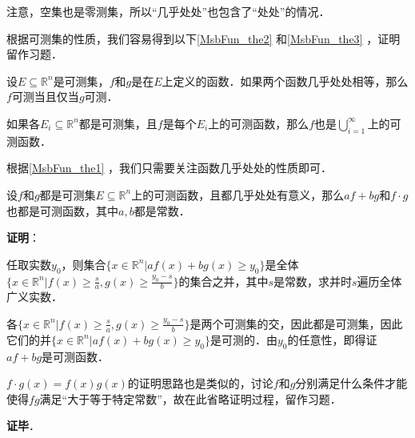 注意，空集也是零测集，所以“几乎处处”也包含了“处处”的情况．

根据可测集的性质，我们容易得到以下\autoref{MsbFun_the2} 和\autoref{MsbFun_the3} ，证明留作习题．

\begin{theorem}{}\label{MsbFun_the2}
设$E\subseteq\mathbb{R}^n$是可测集，$f$和$g$是在$E$上定义的函数．如果两个函数几乎处处相等，那么$f$可测当且仅当$g$可测．
\end{theorem}



\begin{theorem}{}\label{MsbFun_the3}
如果各$E_i\subseteq\mathbb{R}^n$都是可测集，且$f$是每个$E_i$上的可测函数，那么$f$也是$\bigcup_{i=1}^\infty$上的可测函数．
\end{theorem}

根据\autoref{MsbFun_the1} ，我们只需要关注函数几乎处处的性质即可．

\begin{theorem}{}
设$f$和$g$都是可测集$E\subseteq\mathbb{R}^n$上的可测函数，且都几乎处处有意义，那么$af+bg$和$f\cdot g$也都是可测函数，其中$a, b$都是常数．
\end{theorem}

\textbf{证明}：

任取实数$y_0$，则集合$\{x\in\mathbb{R}^n|af(x)+bg(x)\geq y_0\}$是全体$\{x\in\mathbb{R}^n|f(x)\geq \frac{s}{a}, g(x)\geq \frac{y_0-s}{b}\}$的集合之并，其中$s$是常数，求并时$s$遍历全体广义实数．

各$\{x\in\mathbb{R}^n|f(x)\geq \frac{s}{a}, g(x)\geq \frac{y_0-s}{b}\}$是两个可测集的交，因此都是可测集，因此它们的并$\{x\in\mathbb{R}^n|af(x)+bg(x)\geq y_0\}$是可测的．由$y_0$的任意性，即得证$af+bg$是可测函数．

$f\cdot g(x)=f(x)g(x)$的证明思路也是类似的，讨论$f$和$g$分别满足什么条件才能使得$fg$满足“大于等于特定常数”，故在此省略证明过程，留作习题．







\textbf{证毕}．












